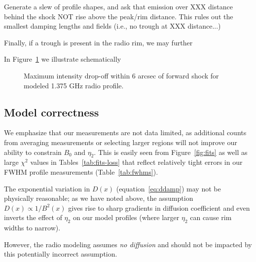 \documentclass[iop, apj, numberedappendix]{emulateapj}
\newcommand*{\mt}{\mathrm}
\newcommand*{\Ecut}{E_{\mt{cut}}}
\newcommand*{\Bmin}{B_{\mt{min}}}
\begin{document}
Generate a slew of profile shapes, and ask that emission over XXX distance
behind the shock NOT rise above the peak/rim distance.  This rules out the
smallest damping lengths and fields (i.e., no trough at XXX distance...)

Finally, if a trough is present in the radio rim, we may further

In Figure~\ref{fig:radio-bound} we illustrate schematically

\begin{figure}
    \centering
    \caption{Maximum intensity drop-off within 6 arcsec of forward shock for
        modeled 1.375 GHz radio profile.
    \label{fig:radio-bound}}
\end{figure}

\subsection{Model correctness}

We emphasize that our measurements are not data limited, as additional counts
from averaging measurements or selecting larger regions will not improve our
ability to constrain $B_0$ and $\eta_2$.  This is easily seen from
Figure~\ref{fig:fits} as well as large $\chi^2$ values in
Tables~\ref{tab:fits-loss} that reflect relatively tight errors in our FWHM
profile measurements (Table~\ref{tab:fwhms}).

The exponential variation in $D(x)$ (equation~\eqref{eq:ddamp}) may not be
physically reasonable; as we have noted above, the assumption $D(x)
\propto 1 / B^2(x)$ gives rise to sharp gradients in diffusion coefficient and
even inverts the effect of $\eta_2$ on our model profiles (where larger
$\eta_2$ can cause rim widths to narrow).

However, the radio modeling assumes \emph{no diffusion} and should not be
impacted by this potentially incorrect assumption.


\end{document}
